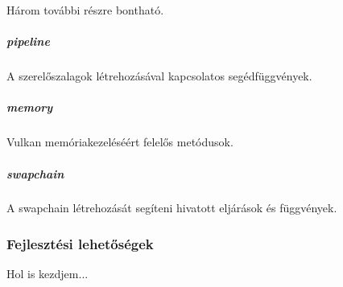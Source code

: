 H\'arom tov\'abbi r\'eszre bonthat\'o.
\subparagraph{pipeline}
A szerel\H oszalagok l\'etrehoz\'as\'aval kapcsolatos seg\'edf\"uggv\'enyek.

\subparagraph{memory}
Vulkan mem\'oriakezel\'es\'e\'ert felel\H os met\'odusok.

\subparagraph{swapchain}
A swapchain l\'etrehoz\'as\'at seg\'iteni hivatott elj\'ar\'asok \'es f\"uggv\'enyek.

\subsubsection{Fejleszt\'esi lehet\H os\'egek}
Hol is kezdjem...
